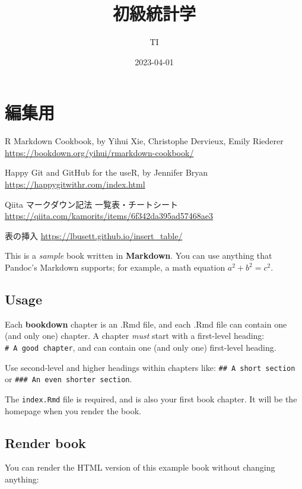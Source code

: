 \documentclass[
]{book}
\title{初級統計学}
\author{TI}
\date{2023-04-01}
\theoremstyle{definition}
\theoremstyle{definition}
\theoremstyle{definition}
\theoremstyle{definition}
\theoremstyle{remark}
\begin{document}
\maketitle

{
\setcounter{tocdepth}{1}
\tableofcontents
}
\hypertarget{ux7de8ux96c6ux7528}{%
\chapter*{編集用}\label{ux7de8ux96c6ux7528}}

R Markdown Cookbook, by Yihui Xie, Christophe Dervieux, Emily Riederer
\url{https://bookdown.org/yihui/rmarkdown-cookbook/}

Happy Git and GitHub for the useR, by Jennifer Bryan
\url{https://happygitwithr.com/index.html}

Qiita マークダウン記法 一覧表・チートシート
\url{https://qiita.com/kamorits/items/6f342da395ad57468ae3}

表の挿入
\url{https://lbusett.github.io/insert_table/}

This is a \emph{sample} book written in \textbf{Markdown}. You can use anything that Pandoc's Markdown supports; for example, a math equation \(a^2 + b^2 = c^2\).

\hypertarget{usage}{%
\section{Usage}\label{usage}}

Each \textbf{bookdown} chapter is an .Rmd file, and each .Rmd file can contain one (and only one) chapter. A chapter \emph{must} start with a first-level heading: \texttt{\#\ A\ good\ chapter}, and can contain one (and only one) first-level heading.

Use second-level and higher headings within chapters like: \texttt{\#\#\ A\ short\ section} or \texttt{\#\#\#\ An\ even\ shorter\ section}.

The \texttt{index.Rmd} file is required, and is also your first book chapter. It will be the homepage when you render the book.

\hypertarget{render-book}{%
\section{Render book}\label{render-book}}

You can render the HTML version of this example book without changing anything:
\end{document}
